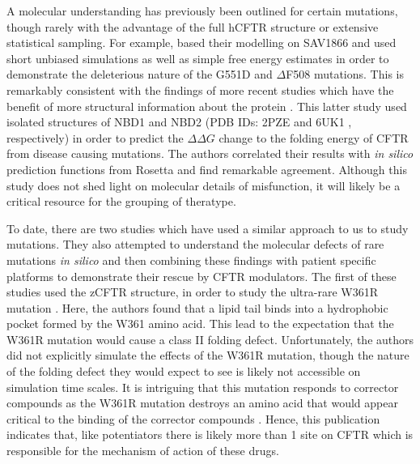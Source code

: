 A molecular understanding has previously been outlined for certain mutations, though rarely with the advantage of the full hCFTR structure or extensive statistical sampling. For example, \cite{belmonte2015} based their modelling on SAV1866 and used short unbiased simulations as well as simple free energy estimates in order to demonstrate the deleterious nature of the G551D and $\Delta$F508 mutations. This is remarkably consistent with the findings of more recent studies which have the benefit of more structural information about the protein \cite{bahia2021}. This latter study used isolated structures of NBD1 and NBD2 (PDB IDs: 2PZE \cite{atwell2010} and 6UK1 \cite {wang_2020_nbd2_CFTR_isoalted_pdb_alone}, respectively) in order to predict the $\Delta\Delta G$ change to the folding energy of CFTR from disease causing mutations. The authors correlated their results with \textit{in silico} prediction functions from Rosetta and find remarkable agreement. Although this study does not shed light on molecular details of misfunction, it will likely be a critical resource for the grouping of theratype. 

To date, there are two studies which have used a similar approach to us to study mutations. They also attempted to understand the molecular defects of rare mutations \textit{in silico} and then combining these findings with patient specific platforms to demonstrate their rescue by CFTR modulators. The first of these studies used the zCFTR structure, in order to study the ultra-rare W361R mutation \cite{billet2020}. Here, the authors found that a lipid tail binds into a hydrophobic pocket formed by the W361 amino acid. This lead to the expectation that the W361R mutation would cause a class II folding defect. Unfortunately, the authors did not explicitly simulate the effects of the W361R mutation, though the nature of the folding defect they would expect to see is likely not accessible on simulation time scales. It is intriguing that this mutation responds to corrector compounds as the W361R mutation destroys an amino acid that would appear critical to the binding of the corrector compounds \cite{fiedorczuk2022}. Hence, this publication indicates that, like potentiators there is likely more than 1 site on CFTR which is responsible for the mechanism of action of these drugs.

